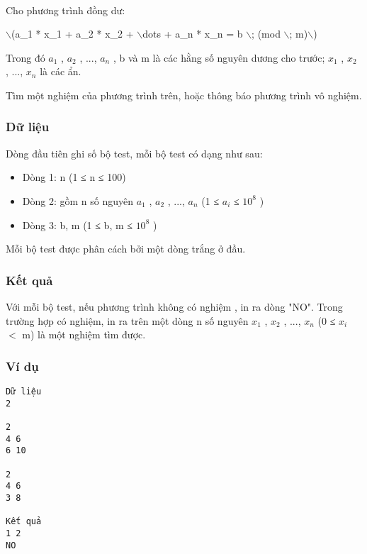 

 

Cho phương trình đồng dư:

$\backslash$(a\_1 * x\_1 + a\_2 * x\_2 + $\backslash$dots + a\_n * x\_n = b $\backslash$; (mod $\backslash$; m)$\backslash$)

Trong đó $a_{1}$ , $a_{2}$ , ..., $a_{n}$ , b và m là các hằng số nguyên dương cho trước; $x_{1}$ , $x_{2}$ , ..., $x_{n}$ là các ẩn.

Tìm một nghiệm của phương trình trên, hoặc thông báo phương trình vô nghiệm.

\subsubsection{Dữ liệu}

Dòng đầu tiên ghi số bộ test, mỗi bộ test có dạng như sau:
\begin{itemize}
	\item Dòng 1: n (1 ≤ n ≤ 100)
	\item Dòng 2: gồm n số nguyên $a_{1}$ , $a_{2}$ , ..., $a_{n}$ (1 ≤ $a_{i}$ ≤ $10^{8}$ )
	\item Dòng 3: b, m (1 ≤ b, m ≤ $10^{8}$ )
\end{itemize}

Mỗi bộ test được phân cách bởi một dòng trắng ở đầu.

\subsubsection{Kết quả}

Với mỗi bộ test, nếu phương trình không có nghiệm , in ra dòng "NO". Trong trường hợp có nghiệm, in ra trên một dòng n số nguyên $x_{1}$ , $x_{2}$ , ..., $x_{n}$ (0 ≤ $x_{i}$ $<$ m) là một nghiệm tìm được.

\subsubsection{Ví dụ}
\begin{verbatim}
Dữ liệu
2

2
4 6
6 10

2
4 6
3 8

Kết quả
1 2
NO
\end{verbatim}
